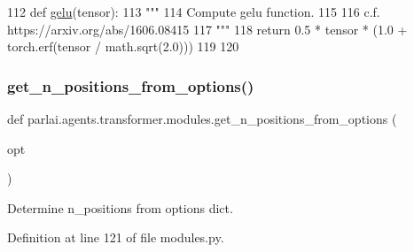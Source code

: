 \begin{DoxyCode}
112 \textcolor{keyword}{def }\hyperlink{namespaceparlai_1_1agents_1_1transformer_1_1modules_ad93916b8d2188c35733089e1581c44f8}{gelu}(tensor):
113     \textcolor{stringliteral}{"""}
114 \textcolor{stringliteral}{    Compute gelu function.}
115 \textcolor{stringliteral}{}
116 \textcolor{stringliteral}{    c.f. https://arxiv.org/abs/1606.08415}
117 \textcolor{stringliteral}{    """}
118     \textcolor{keywordflow}{return} 0.5 * tensor * (1.0 + torch.erf(tensor / math.sqrt(2.0)))
119 
120 
\end{DoxyCode}
\mbox{\label{namespaceparlai_1_1agents_1_1transformer_1_1modules_ab67607512c597ddd54f2b60a1a1eaf4c}} 
\subsubsection{\texorpdfstring{get\+\_\+n\+\_\+positions\+\_\+from\+\_\+options()}{get\_n\_positions\_from\_options()}}
{\footnotesize\ttfamily def parlai.\+agents.\+transformer.\+modules.\+get\+\_\+n\+\_\+positions\+\_\+from\+\_\+options (\begin{DoxyParamCaption}\item[{}]{opt }\end{DoxyParamCaption})}

\begin{DoxyVerb}Determine n_positions from options dict.
\end{DoxyVerb}
 

Definition at line 121 of file modules.\+py.


